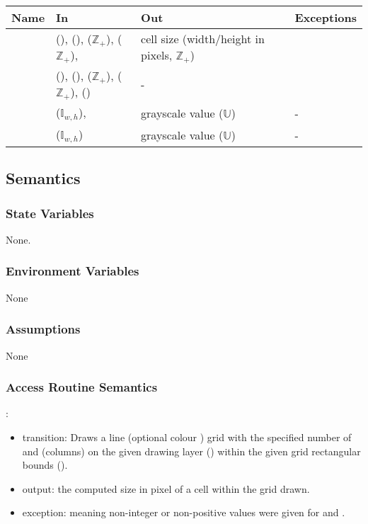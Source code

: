 \documentclass[12pt, titlepage]{article}
\begin{document}
\begin{center}
\begin{tabular}{L{4.2cm} L{4.2cm} L{3.6cm} L{3cm}}
\hline
\textbf{Name} & \textbf{In} & \textbf{Out} & \textbf{Exceptions} \\
\hline
{} &  (),  (),
   ($\mathbb{Z}_+$),  ($\mathbb{Z}_+$), 
  & cell size (width/height in pixels, $\mathbb{Z}_+$) &  \\
\hline
{} &  (),  (),  ($\mathbb{Z}_+$),
   ($\mathbb{Z}_+$),  ()
  & - &  \\
\hline
{} &  ($\mathbb{I}_{w,h}$),
   & grayscale value ($\mathbb{U}$) & - \\
\hline
{} &  ($\mathbb{I}_{w,h}$) & grayscale value ($\mathbb{U}$) & - \\
\hline
\end{tabular}
\end{center}

\subsection{Semantics}

\subsubsection{State Variables}
None.

\subsubsection{Environment Variables}
None

\subsubsection{Assumptions}
None

\subsubsection{Access Routine Semantics}

\noindent {}:
\begin{itemize}
\item transition: Draws a line (optional colour ) grid with the specified
  number of  and  (columns) on the given drawing layer ()
  within the given grid rectangular bounds ().
\item output: the computed size in pixel of a cell within the grid drawn.
\item exception:  meaning non-integer or non-positive values were given for
   and .
\end{itemize}
\end{document}
